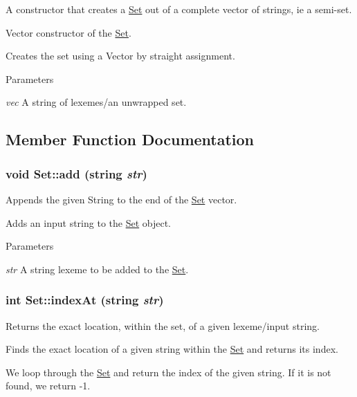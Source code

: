 A constructor that creates a \hyperlink{classSet}{Set} out of a complete vector of strings, ie a semi-\/set. 

Vector constructor of the \hyperlink{classSet}{Set}.

Creates the set using a Vector by straight assignment. 
\begin{DoxyParams}{Parameters}
\item[{\em vec}]A string of lexemes/an unwrapped set. \end{DoxyParams}


\subsection{Member Function Documentation}
\hypertarget{classSet_a7b7abf085543d6416445543d9ecec250}{
\subsubsection[{add}]{\setlength{\rightskip}{0pt plus 5cm}void Set::add (string {\em str})}}
\label{classSet_a7b7abf085543d6416445543d9ecec250}


Appends the given String to the end of the \hyperlink{classSet}{Set} vector. 

Adds an input string to the \hyperlink{classSet}{Set} object.


\begin{DoxyParams}{Parameters}
\item[{\em str}]A string lexeme to be added to the \hyperlink{classSet}{Set}. \end{DoxyParams}
\hypertarget{classSet_a8e7922429ab244828e26e98ffc10d11f}{
\subsubsection[{indexAt}]{\setlength{\rightskip}{0pt plus 5cm}int Set::indexAt (string {\em str})}}
\label{classSet_a8e7922429ab244828e26e98ffc10d11f}


Returns the exact location, within the set, of a given lexeme/input string. 

Finds the exact location of a given string within the \hyperlink{classSet}{Set} and returns its index.

We loop through the \hyperlink{classSet}{Set} and return the index of the given string. If it is not found, we return -\/1.


